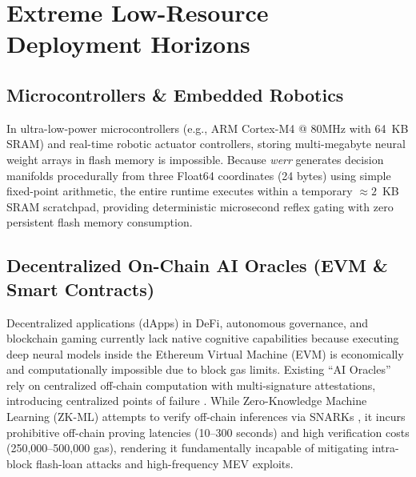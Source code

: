 \documentclass[10pt,journal,compsoc,twocolumn]{article}
\begin{document}
\section{Extreme Low-Resource Deployment Horizons}

\subsection{Microcontrollers \& Embedded Robotics}
In ultra-low-power microcontrollers (e.g., ARM Cortex-M4 @ 80MHz with 64~KB SRAM) and real-time robotic actuator controllers, storing multi-megabyte neural weight arrays in flash memory is impossible. Because \textit{werr} generates decision manifolds procedurally from three Float64 coordinates (24 bytes) using simple fixed-point arithmetic, the entire runtime executes within a temporary $\approx 2$~KB SRAM scratchpad, providing deterministic microsecond reflex gating with zero persistent flash memory consumption.

\subsection{Decentralized On-Chain AI Oracles (EVM \& Smart Contracts)}
Decentralized applications (dApps) in DeFi, autonomous governance, and blockchain gaming currently lack native cognitive capabilities because executing deep neural models inside the Ethereum Virtual Machine (EVM) is economically and computationally impossible due to block gas limits. Existing ``AI Oracles'' rely on centralized off-chain computation with multi-signature attestations, introducing centralized points of failure \cite{zhang2016town}. While Zero-Knowledge Machine Learning (ZK-ML) attempts to verify off-chain inferences via SNARKs \cite{bensasson2014snarks}, it incurs prohibitive off-chain proving latencies (10--300 seconds) and high verification costs (250,000--500,000 gas), rendering it fundamentally incapable of mitigating intra-block flash-loan attacks and high-frequency MEV exploits.
\end{document}
